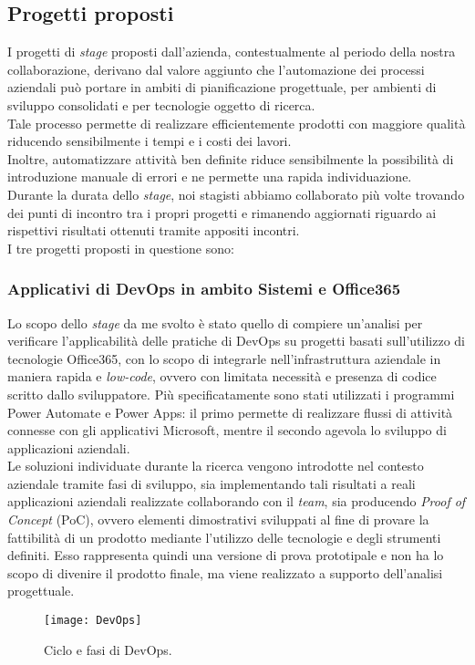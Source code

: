 \subsection{Progetti proposti}
I progetti di \emph{stage} proposti dall'azienda, contestualmente al periodo della nostra collaborazione, derivano dal valore aggiunto che l'automazione dei processi aziendali può portare in ambiti di pianificazione progettuale, per ambienti di sviluppo consolidati e per tecnologie oggetto di ricerca.\\
Tale processo permette di realizzare efficientemente prodotti con maggiore qualità riducendo sensibilmente i tempi e i costi dei lavori.\\
Inoltre, automatizzare attività ben definite riduce sensibilmente la possibilità di introduzione manuale di errori e ne permette una rapida individuazione.\\
Durante la durata dello \emph{stage}, noi stagisti abbiamo collaborato più volte trovando dei punti di incontro tra i propri progetti e rimanendo aggiornati riguardo ai rispettivi risultati ottenuti tramite appositi incontri.\\
I tre progetti proposti in questione sono: 

\subsubsection*{Applicativi di DevOps in ambito Sistemi e Office365}
\label{mioStage}
Lo scopo dello \emph{stage} da me svolto è stato quello di compiere un'analisi per verificare l'applicabilità delle pratiche di \gls{DevOps} su progetti basati sull'utilizzo di tecnologie Office365, con lo scopo di integrarle nell'infrastruttura aziendale in maniera rapida e \emph{low-code}, ovvero con limitata necessità e presenza di codice scritto dallo sviluppatore. Più specificatamente sono stati utilizzati i programmi Power Automate e Power Apps: il primo permette di realizzare flussi di attività connesse con gli applicativi Microsoft, mentre il secondo agevola lo sviluppo di applicazioni aziendali.\\
Le soluzioni individuate durante la ricerca vengono introdotte nel contesto aziendale tramite fasi di sviluppo, sia implementando tali risultati a reali applicazioni aziendali realizzate collaborando con il \emph{team}, sia producendo \emph{Proof of Concept} (PoC), ovvero elementi dimostrativi sviluppati al fine di provare la fattibilità di un prodotto mediante l'utilizzo delle tecnologie e degli strumenti definiti. Esso rappresenta quindi una versione di prova prototipale e non ha lo scopo di divenire il prodotto finale, ma viene realizzato a supporto dell'analisi progettuale.
\begin{figure}[htbp] 
    \centering 
    \texttt{[image: DevOps]}
    \caption{Ciclo e fasi di DevOps.} 
    \label{fig:DevOps}
\end{figure}

